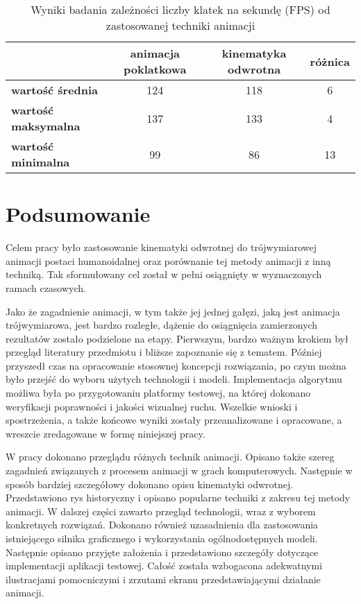 \documentclass[11pt]{mwrep}
\begin{document}
\begin{table}[p]

\begin{center}

\begin{tabular}{|l||c|c|c|} 
\hline

 & \textbf{animacja poklatkowa} & \textbf{kinematyka odwrotna} & \textbf{różnica} \\ \hline 

\hline

\textbf{wartość średnia} & 124 & 118 & 6 \\ \hline
\textbf{wartość maksymalna} & 137 & 133 & 4 \\ \hline
\textbf{wartość minimalna} & 99 & 86 & 13 \\ \hline

  \end{tabular}
\end{center}
  \caption{Wyniki badania zależności liczby klatek na sekundę (FPS) od zastosowanej techniki animacji}
\label{tab:results}
\end{table}


\chapter{Podsumowanie}

Celem pracy było zastosowanie kinematyki odwrotnej do trójwymiarowej animacji postaci humanoidalnej oraz porównanie tej metody animacji z inną techniką. Tak sformułowany cel został w pełni osiągnięty w wyznaczonych ramach czasowych. 

Jako że zagadnienie animacji, w tym także jej jednej gałęzi, jaką jest animacja trójwymiarowa, jest bardzo rozległe, dążenie do osiągnięcia zamierzonych rezultatów zostało podzielone na etapy. Pierwszym, bardzo ważnym krokiem był przegląd literatury przedmiotu i bliższe zapoznanie się z tematem. Później przyszedł czas na opracowanie stosownej koncepcji rozwiązania, po czym można było przejść do wyboru użytych technologii i modeli. Implementacja algorytmu możliwa była po przygotowaniu platformy testowej, na której dokonano  weryfikacji poprawności i jakości wizualnej ruchu. Wszelkie wnioski i spostrzeżenia, a także końcowe wyniki zostały przeanalizowane i opracowane, a wreszcie zredagowane w formę niniejszej pracy.

W pracy dokonano przeglądu różnych technik animacji. Opisano także szereg zagadnień związanych z procesem animacji w grach komputerowych. Następnie w sposób bardziej szczegółowy dokonano opisu kinematyki odwrotnej. Przedstawiono rys historyczny i opisano popularne techniki z zakresu tej metody animacji. W dalszej części zawarto przegląd technologii, wraz z wyborem konkretnych rozwiązań. Dokonano również uzasadnienia dla zastosowania istniejącego silnika graficznego i wykorzystania ogólnodostępnych modeli. Następnie opisano przyjęte założenia i przedstawiono szczegóły dotyczące implementacji aplikacji testowej. Całość została wzbogacona adekwatnymi ilustracjami pomocniczymi i zrzutami ekranu przedstawiającymi działanie animacji.
\end{document}
